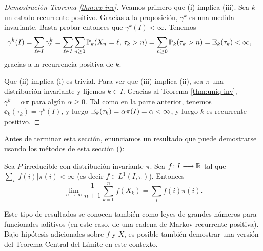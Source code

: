 \begin{proof}[Demostración Teorema \ref{thm:ex-inv}]
Veamos primero que (i) implica (iii).
Sea $k$ un estado recurrente positivo.
Gracias a la proposición, $\gamma^k$ es una medida invariante.
Basta probar entonces que $\gamma^k(I)<\infty$.
Tenemos
\begin{align}
\gamma^k(I)&=\sum_{\ell\in I}\gamma^k_\ell=\sum_{\ell\in I}\sum_{n\geq0}\mathbb{P}_k(X_n=\ell,\,\tau_k>n)=\sum_{n\geq0}\mathbb{P}_k(\tau_k>n)=\mathbb{E}_k(\tau_k)<\infty,
\end{align}
gracias a la recurrencia positiva de $k$.

Que (ii) implica (i) es trivial.
Para ver que (iii) implica (ii), sea $\pi$ una distribución invariante y fijemos $k\in I$.
Gracias al Teorema \ref{thm:uniq-inv}, $\gamma^k=\alpha\pi$ para algún $\alpha\geq0$.
Tal como en la parte anterior, tenemos $\ee_k(\tau_k)=\gamma^k(I)$, y luego $\mathbb{E}_k(\tau_k)=\alpha\hspace{0.05em}\pi(I)=\alpha<\infty$, y luego $k$ es recurrente positivo.
\end{proof}

Antes de terminar esta sección, enunciamos un resultado que puede demostrarse usando los métodos de esta sección (\ucmark):

\begin{thm}\label{thm:ergodMC}
Sea $P$ irreducible con distribución invariante $\pi$.
Sea $f\!:I\longrightarrow\mathbb{R}$ tal que $\sum_i|f(i)|\pi(i)<\infty$ (es decir $f\in L^1(I,\pi)$).
Entonces
\[\lim_{n\to\infty}\frac1{n+1}\sum_{k=0}^nf(X_k)=\sum_if(i)\pi(i).\]
\end{thm}

Este tipo de resultados se conocen también como leyes de grandes números para funcionales aditivos (en este caso, de una cadena de Markov recurrente positiva).
Bajo hipótesis adicionales sobre $f$ y $X$, es posible también demostrar una versión del Teorema Central del Límite en este contexto.